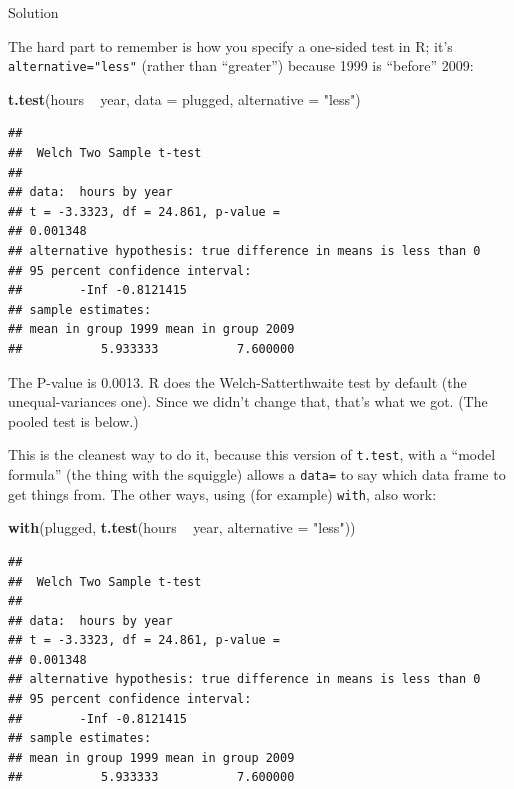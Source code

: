 \documentclass[]{tufte-book}
\newenvironment{Shaded}{}{}
\newcommand{\DataTypeTok}[1]{\textcolor[rgb]{0.56,0.13,0.00}{#1}}
\newcommand{\KeywordTok}[1]{\textcolor[rgb]{0.00,0.44,0.13}{\textbf{#1}}}
\newcommand{\NormalTok}[1]{#1}
\newcommand{\OperatorTok}[1]{\textcolor[rgb]{0.40,0.40,0.40}{#1}}
\newcommand{\StringTok}[1]{\textcolor[rgb]{0.25,0.44,0.63}{#1}}
\theoremstyle{definition}
\theoremstyle{definition}
\theoremstyle{definition}
\theoremstyle{remark}
\begin{document}
Solution

The hard part to remember is how you specify a one-sided test in R; it's
\texttt{alternative="less"} (rather than ``greater'') because 1999 is
``before'' 2009:

\begin{Shaded}
\begin{Highlighting}[]
\KeywordTok{t.test}\NormalTok{(hours }\OperatorTok{~}\StringTok{ }\NormalTok{year, }\DataTypeTok{data =}\NormalTok{ plugged, }\DataTypeTok{alternative =} \StringTok{"less"}\NormalTok{)}
\end{Highlighting}
\end{Shaded}

\begin{verbatim}
## 
##  Welch Two Sample t-test
## 
## data:  hours by year
## t = -3.3323, df = 24.861, p-value =
## 0.001348
## alternative hypothesis: true difference in means is less than 0
## 95 percent confidence interval:
##        -Inf -0.8121415
## sample estimates:
## mean in group 1999 mean in group 2009 
##           5.933333           7.600000
\end{verbatim}

The P-value is 0.0013. R does the Welch-Satterthwaite test by default
(the unequal-variances one). Since we didn't change that, that's what we
got. (The pooled test is below.)

This is the cleanest way to do it, because this version of
\texttt{t.test}, with a ``model formula'' (the thing with the squiggle)
allows a \texttt{data=} to say which data frame to get things from. The
other ways, using (for example) \texttt{with}, also work:

\begin{Shaded}
\begin{Highlighting}[]
\KeywordTok{with}\NormalTok{(plugged, }\KeywordTok{t.test}\NormalTok{(hours }\OperatorTok{~}\StringTok{ }\NormalTok{year, }\DataTypeTok{alternative =} \StringTok{"less"}\NormalTok{))}
\end{Highlighting}
\end{Shaded}

\begin{verbatim}
## 
##  Welch Two Sample t-test
## 
## data:  hours by year
## t = -3.3323, df = 24.861, p-value =
## 0.001348
## alternative hypothesis: true difference in means is less than 0
## 95 percent confidence interval:
##        -Inf -0.8121415
## sample estimates:
## mean in group 1999 mean in group 2009 
##           5.933333           7.600000
\end{verbatim}
\end{document}
